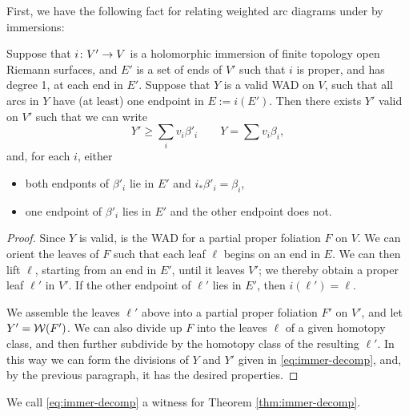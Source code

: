 First, we have the following fact for relating weighted arc diagrams under by immersions:
\begin{theorem} \label{thm:immer-decomp}
Suppose that $i\colon V' \to V$ is a holomorphic immersion of finite topology open Riemann surfaces, and $E'$ is a set of ends of $V'$ such that $i$ is proper, and has degree 1, at each end in $E'$.
Suppose that $Y$ is a valid WAD on $V$, 
such that all arcs in $Y$ have (at least) one endpoint in $E := i(E')$. 
Then there exists $Y'$ valid on $V'$ such that we can write 
\begin{equation} \label{eq:immer-decomp}
Y' \ge \sum_i v_i \beta'_i \qquad Y = \sum v_i \beta_i,
\end{equation}
and,
for each $i$,
either
\begin{itemize}
\item
both endponts of $\beta'_i$ lie in $E'$ and $i_*\beta'_i = \beta_i$,
\item
one endpoint of $\beta'_i$ lies in $E'$ and the other endpoint does not. 
\end{itemize}
\end{theorem}


\begin{proof}
Since $Y$ is valid, is the WAD for a partial proper foliation $F$ on $V$. 
We can orient the leaves of $F$ such that each leaf $\ell$ begins on an end in $E$.
We can then lift $\ell$, 
starting from an end in $E'$, 
until it leaves $V'$; we thereby obtain a proper leaf $\ell'$ in $V'$.
If the other endpoint of $\ell'$ lies in $E'$, 
then $i(\ell') = \ell$. 

We assemble the leaves $\ell'$ above into a partial proper foliation $F'$ on $V'$, and let $Y' = \mathcal W(F')$.
We can also divide up $F$ into the leaves $\ell$ of a given homotopy class, and then further subdivide by the homotopy class of the resulting $\ell'$. In this way we can form the divisions of $Y$ and $Y'$ given in \eqref{eq:immer-decomp}, and, by the previous paragraph, it has the desired properties. 
\end{proof}

We call \eqref{eq:immer-decomp} a witness for Theorem \ref{thm:immer-decomp}.


